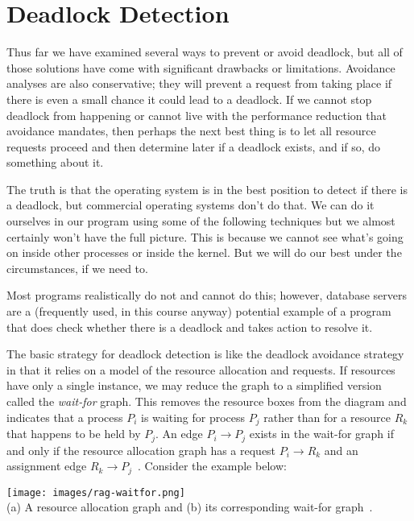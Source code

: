 




\section*{Deadlock Detection}
Thus far we have examined several ways to prevent or avoid deadlock, but all of those solutions have come with significant drawbacks or limitations. Avoidance analyses are also conservative; they will prevent a request from taking place if there is even a small chance it could lead to a deadlock. If we cannot stop deadlock from happening or cannot live with the performance reduction that avoidance mandates, then perhaps the next best thing is to let all resource requests proceed and then determine later if a deadlock exists, and if so, do something about it.

The truth is that the operating system is in the best position to detect if there is a deadlock, but commercial operating systems don't do that. We can do it ourselves in our program using some of the following techniques but we almost certainly won't have the full picture. This is because we cannot see what's going on inside other processes or inside the kernel. But we will do our best under the circumstances, if we need to.

Most programs realistically do not and cannot do this; however, database servers are a (frequently used, in this course anyway) potential example of a program that does check whether there is a deadlock and takes action to resolve it.

The basic strategy for deadlock detection is like the deadlock avoidance strategy in that it relies on a model of the resource allocation and requests. If resources have only a single instance, we may reduce the graph to a simplified version called the \textit{wait-for} graph. This removes the resource boxes from the diagram and indicates that a process $P_{i}$ is waiting for process $P_{j}$ rather than for a resource $R_{k}$ that happens to be held by $P_{j}$. An edge $P_{i} \rightarrow P_{j}$ exists in the wait-for graph if and only if the resource allocation graph has a request $P_{i} \rightarrow R_{k}$ and an assignment edge $R_{k} \rightarrow P_{j}$~\cite{osc}. Consider the example below:

\begin{center}
	\texttt{[image: images/rag-waitfor.png]}\\
	(a) A resource allocation graph and (b) its corresponding wait-for graph~\cite{osc}.
\end{center}

